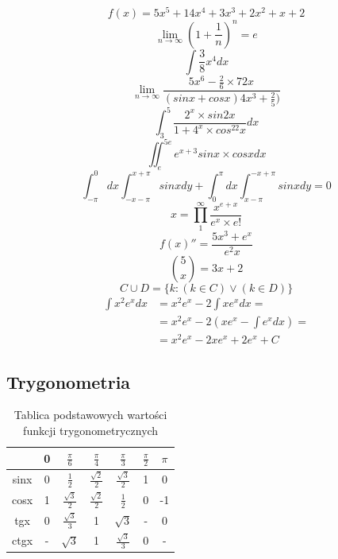 \documentclass{article}
\begin{document}
\begin{equation}
f(x) = 5x^5 + 14x^4 + 3x^3 + 2x^2 + x + 2
\end{equation}
$$\lim_{n \to \infty} {({1} + \frac{1}{n})^n}=e$$
$$\int {{\frac{3}{8}x^4dx}}$$
$$\lim_{n \to \infty}\frac{5x^{6}-\frac{2}{6}\times 72x^{}}{(sinx + cos x)4x^{3}+\frac{2}{5})}$$
$$\int_{3}^{5} \frac{2^x\times sin2x}{1+4^x \times cos^22x}dx$$
$$\iint_{e}^{5e}e^{x+3}sinx \times cosx dx$$
$$\int_{-\pi}^{0}dx\int_{-x - \pi}^{x + \pi}sinx dy + \int_{0}^{\pi}dx\int_{x - \pi}^{-x + \pi}sinx dy =0$$
$$x = \prod_{1}^{\infty}\frac{x^{e+x}}{e^{x} \times e!}$$
$${f(x)}''=\frac{5x^3 + e^x}{e^2x}$$
$$\binom{5}{x}=3x+2$$
\begin{equation}
C\cup D = \{k \colon (k \in C) \vee (k \in D)\}
\end{equation}
\begin{equation}
\label{eq:calka1}
\begin{split}
\int x^2 e^x dx & = x^2 e^x - 2 \int x e^x dx = \\
& = x^2 e^x - 2 \left( x e^x - \int e^x dx \right ) = \\
& = x^2 e^x -2x e^x + 2 e^x + C
\end{split}
\end{equation}

\newpage
\subsection{Trygonometria}
\begin{table}[h!]
\caption{Tablica podstawowych wartości funkcji trygonometrycznych}
\label{Trygonometria}
\begin{center}
\begin{tabular}{c|c|c|c|c|c|c|}
\cline{2-7}
 & 0 & $\frac{\pi}{6}$ & $\frac{\pi}{4}$ & $\frac{\pi}{3}$ & $\frac{\pi}{2}$ & $\pi$ \\ \hline
\multicolumn{1}{|c|}{sinx} & 0 & $\frac{1}{2}$ & $\frac{\sqrt{2}}{2}$ & $\frac{\sqrt{3}}{2}$ & 1 & 0 \\ \hline
\multicolumn{1}{|c|}{cosx} & 1 & $\frac{\sqrt{3}}{2}$ & $\frac{\sqrt{2}}{2}$ & $\frac{1}{2}$ & 0 & -1 \\ \hline
\multicolumn{1}{|c|}{tgx} & 0 & $\frac{\sqrt{3}}{3}$ & 1 & $\sqrt{3}$ & - & 0 \\ \hline
\multicolumn{1}{|c|}{ctgx} & - & $\sqrt{3}$ & 1 & $\frac{\sqrt{3}}{3}$ & 0 & - \\ \hline
\end{tabular}
\end{center}
\end{table}
\end{document}
